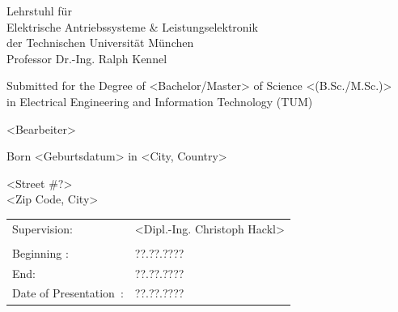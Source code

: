 \vspace{1.5cm}

\begin{center}Lehrstuhl für \\ Elektrische Antriebssysteme \& Leistungselektronik\\
der Technischen Universität München\\
Professor Dr.-Ing. Ralph Kennel\par\end{center}

\hfill

\begin{center}Submitted for the Degree of <Bachelor/Master> of Science <(B.Sc./M.Sc.)> \\ 
in Electrical Engineering and Information Technology (TUM) \par\end{center}

\vspace{0.8cm}

\begin{center}{\large <Bearbeiter>}\par\end{center}{\large \par}

\vspace{1.0cm}

\begin{center}Born <Geburtsdatum> in <City, Country>\par\end{center}

\vspace{1cm}

\begin{center}<Street \#?>\\
<Zip Code, City>\par\end{center}

\vspace{1cm}

\hspace*{-4cm}

\begin{flushleft}\begin{tabular}{ll}
Supervision\hfill :&
<Dipl.-Ing. Christoph Hackl>\tabularnewline
&
\tabularnewline
Beginning \hfill :&
??.??.????\tabularnewline
End\hfill :&
??.??.????\tabularnewline
Date of Presentation\hfill ~:&
??.??.????\tabularnewline
\end{tabular}\par\end{flushleft}

